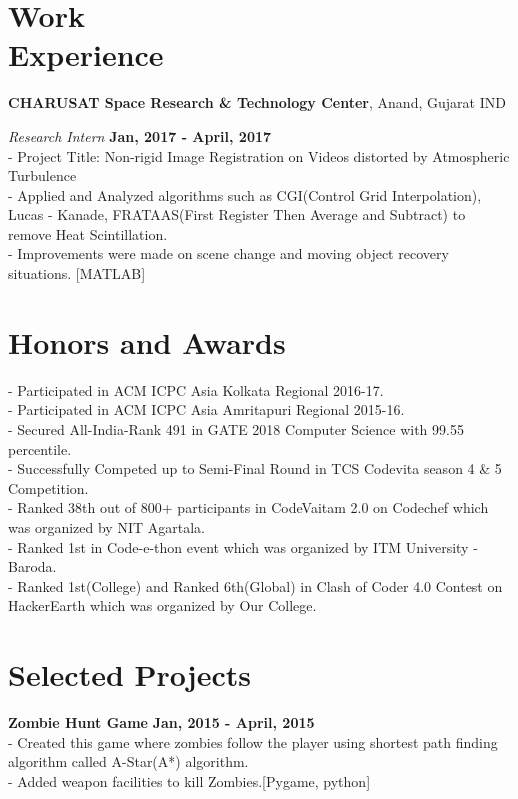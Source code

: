 \documentclass[margin,line]{res}
\begin{document}
\begin{resume}
%

\section{\sc Work \\ Experience}
{\bf CHARUSAT Space Research \& Technology Center}, Anand, Gujarat IND

\vspace{-.3cm}
{\em Research Intern} \hfill {\bf Jan, 2017 - April, 2017}\\
- Project Title: Non-rigid Image Registration on Videos distorted by Atmospheric Turbulence \\
- Applied and Analyzed algorithms such as CGI(Control Grid Interpolation), Lucas - Kanade, FRATAAS(First Register Then Average and Subtract) to remove Heat Scintillation.\\
- Improvements were made on scene change and moving object recovery situations. [MATLAB]

\section{\sc Honors and Awards} 
- Participated in ACM ICPC Asia Kolkata Regional 2016-17.\\
- Participated in ACM ICPC Asia Amritapuri Regional 2015-16. \\
- Secured All-India-Rank 491 in GATE 2018 Computer Science with 99.55 percentile.\\
- Successfully Competed up to Semi-Final Round in TCS Codevita season 4 \& 5 Competition.\\
- Ranked 38th out of 800+ participants in CodeVaitam 2.0 on Codechef which was organized by NIT Agartala.\\
- Ranked 1st in Code-e-thon event which was organized by ITM University - Baroda.\\
- Ranked 1st(College) and Ranked 6th(Global) in Clash of Coder 4.0 Contest on HackerEarth which was organized by Our College.

\section{\sc Selected Projects}
{\bf Zombie Hunt Game}
\hfill {\bf Jan, 2015 - April, 2015}\\
- Created this game where zombies follow the player using shortest path finding algorithm called A-Star(A*) algorithm. \\
- Added weapon facilities to kill Zombies.[Pygame, python]


\end{resume}
\end{document}
